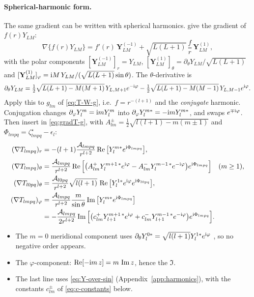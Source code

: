 \paragraph{Spherical-harmonic form.} The same gradient can be written with spherical harmonics. \citet[\S7.3, eq.~25--27 and 51]{Varshalovich1988} give the gradient of $f(r)Y_{LM}$:
\[
  \nabla\{f(r)Y_{LM}\}=f'(r)\,\mathbf Y^{(-1)}_{LM}+\sqrt{L(L+1)}\,\frac{f}{r}\,\mathbf Y^{(1)}_{LM},
\]
with the polar components $[\mathbf Y^{(-1)}_{LM}]_r=Y_{LM}$, $[\mathbf Y^{(1)}_{LM}]_\theta=\partial_\theta Y_{LM}/\sqrt{L(L+1)}$ and $[\mathbf Y^{(1)}_{LM}]_\varphi=\mathrm{i} M\,Y_{LM}/(\sqrt{L(L+1)}\sin\theta)$. The $\theta$-derivative is \citep[eq.~5.8(5)]{Varshalovich1988}
\[
  \partial_\theta Y_{LM}=\tfrac12\sqrt{L(L+1)-M(M+1)}\,Y_{L,M+1}e^{-\mathrm{i}\varphi}-\tfrac12\sqrt{L(L+1)-M(M-1)}\,Y_{L,M-1}e^{\mathrm{i}\varphi}.
\]
Apply this to $g_{lm}$ of \eqref{eq:T-W-g}, i.e.\ $f=r^{-(l+1)}$ and the \emph{conjugate} harmonic. Conjugation changes $\partial_\varphi Y_l^m=\mathrm{i} mY_l^m$ into $\partial_\varphi Y_l^{m*}=-\mathrm{i} mY_l^{m*}$, and swaps $e^{\mp\mathrm{i}\varphi}$. Then insert in \eqref{eq:gradT-g}, with $A^\pm_{lm}=\frac12\sqrt{l(l+1)-m(m\pm1)}$ and $\Phi_{lmpq}=\zeta^\star_{lmpq}-\epsilon_l$:
\begin{equation}
  \begin{aligned}
  (\nabla T_{lmpq})_r&=-(l+1)\frac{\mathcal A_{lmpq}}{r^{l+2}}\operatorname{Re}\big[Y_l^{m*}e^{\mathrm{i}\Phi_{lmpq}}\big],\\
  (\nabla T_{lmpq})_\theta&=\frac{\mathcal A_{lmpq}}{r^{l+2}}\operatorname{Re}\Big[\big(A^+_{lm}Y_l^{m+1\,*}e^{\mathrm{i}\varphi}-A^-_{lm}Y_l^{m-1\,*}e^{-\mathrm{i}\varphi}\big)e^{\mathrm{i}\Phi_{lmpq}}\Big]\quad(m\ge1),\\
  (\nabla T_{l0pq})_\theta&=\frac{\mathcal A_{l0pq}}{r^{l+2}}\sqrt{l(l+1)}\,\operatorname{Re}\big[Y_l^{1*}e^{\mathrm{i}\varphi}e^{\mathrm{i}\Phi_{l0pq}}\big],\\
  (\nabla T_{lmpq})_\varphi&=\frac{\mathcal A_{lmpq}}{r^{l+2}}\frac{m}{\sin\theta}\operatorname{Im}\big[Y_l^{m*}e^{\mathrm{i}\Phi_{lmpq}}\big]\\
  &=-\frac{\mathcal A_{lmpq}}{2r^{l+2}}\operatorname{Im}\Big[\big(c^+_{lm}Y_{l+1}^{m+1\,*}e^{\mathrm{i}\varphi}+c^-_{lm}Y_{l+1}^{m-1\,*}e^{-\mathrm{i}\varphi}\big)e^{\mathrm{i}\Phi_{lmpq}}\Big].
  \end{aligned} \label{eq:grad-polar-cplx}
\end{equation}
\begin{itemize}
  \item The $m=0$ meridional component uses $\partial_\theta Y_l^{0*}=\sqrt{l(l+1)}Y_l^{1*}e^{\mathrm{i}\varphi}$ \citep[eq.~5.8(5)]{Varshalovich1988}, so no negative order appears.
  \item The $\varphi$-component: $\operatorname{Re}[-\mathrm{i} m\,z]=m\,\operatorname{Im} z$, hence the $\Im$.
  \item The last line uses \eqref{eq:Y-over-sin} (Appendix~\ref{app:harmonics}), with the constants $c^\pm_{lm}$ of \eqref{eq:c-constants} below.
\end{itemize}

